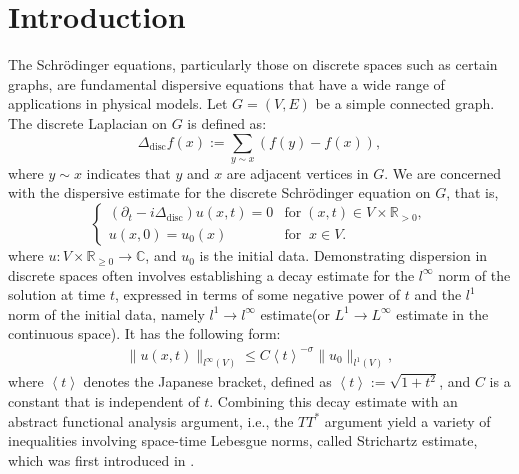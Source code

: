 \documentclass[12pt]{amsart}
\newcommand{\R}{\mathbb{R}}
\newcommand{\C}{\mathbb{C}}
\begin{document}
	\section{Introduction } \label{intro}
	The Schr\"odinger equations, particularly those on discrete spaces such as certain graphs, are fundamental dispersive equations that have a wide range of applications in physical models\cite{BCFMMI02, CLS03, FW12, FW20, KAT01, LFO06, MPAES99, OOSB01}. Let $G=(V, E)$ be a simple connected graph. The discrete Laplacian on $G$ is defined as:
	\begin{equation*}
		\Delta_{\mathrm{disc}}f(x) := \sum_{y\sim x} (f(y) - f(x)),
	\end{equation*}
	where $y\sim x$ indicates that $y$ and $x$ are adjacent vertices in $G$. 
	We are concerned with the dispersive  estimate for the discrete Schr\"odinger equation on $G$, that is, 
	\begin{equation}\label{eq:DS}
		\begin{cases}
			\left(\partial_{t}-i\Delta_{\mathrm{disc}}\right)u\left(x,t\right)=0&\mathrm{for}\;\left(x,t\right)\in V\times\R_{>0},\\
			u\left(x,0\right)=u_{0}\left(x\right)&\mathrm{for}\;\;x\in V.
		\end{cases}
	\end{equation}
	where $u:{V}\times\R_{\geq0}\to\C$,  and $u_{0}$ is the initial data.
	Demonstrating dispersion in discrete spaces often involves establishing a decay estimate for the $ l^\infty $ norm of the solution at time $ t $, expressed in terms of some negative power of $ t $ and the $ l^1 $ norm of the initial data, namely $ l^1 \to  l^\infty$ estimate(or $ L^1 \to  L^\infty$ estimate in the continuous space). It has the following form:
	\begin{align}\label{Strichartz estimate}
		\|u(x,t)\|_{l^\infty(V)}\le C\left\langle t\right\rangle^{-\sigma}\|u_0\|_{l^1(V)},
	\end{align}
where $\left\langle t\right\rangle$ denotes the Japanese bracket, defined as $\left\langle t\right\rangle:=\sqrt{1+t^{2}}$, and $C$ is a constant that is independent of $t$. Combining this decay estimate with an abstract functional analysis argument, i.e., the \( TT^* \) argument yield a variety of inequalities involving space-time Lebesgue norms, called Strichartz estimate, which was first introduced in \cite{S77}.
	
\end{document}
